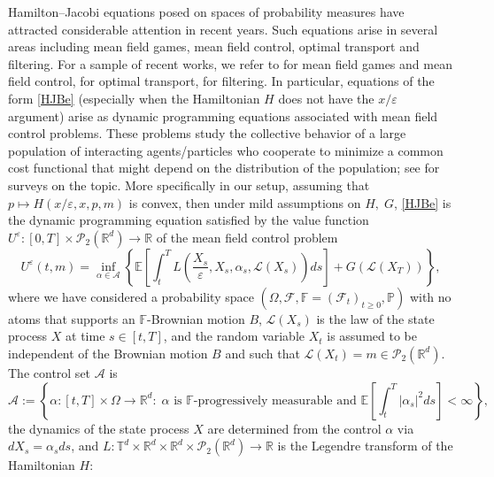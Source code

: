 \documentclass[reqno,11pt]{amsart}
\numberwithin{equation}{section}
\newcommand{\R}{\mathbb{R}} %
\newcommand{\e}{\varepsilon}
\newcommand{\T}{\mathbb{T}}
\renewcommand{\L}{\mathcal{L}}
\newcommand{\nd}{\noindent}
\begin{document}
    \nd
    Hamilton--Jacobi equations posed on spaces of probability measures have attracted considerable attention in recent years. Such equations arise in several areas including mean field games, mean field control, optimal transport and filtering. For a sample of recent works, we refer to \cite{cardaliaguet2019master} for mean field games and mean field control, \cite{bertucci2024stochastic} for optimal transport, \cite{martini2023kolmogorov,BayraktarEkrenHeZhang2025SC} for filtering.
    In particular, equations of the form \eqref{HJBe} (especially when the Hamiltonian $H$ does not have the $x/\e$ argument) arise as dynamic programming equations associated with mean field control problems. These problems study the collective behavior of a large population of interacting agents/particles who cooperate to minimize a common cost functional that might depend on the distribution of the population; see \cite{carmona2018probabilistic, cardaliaguet2019master} for surveys on the topic. More specifically in our setup, assuming that $p\mapsto H(x/\e,x,p,m)$ is convex, then under mild  assumptions on $H,\;G$, \eqref{HJBe}
    is the dynamic programming equation \cite{djete2022mckean1} satisfied by the value function $U^\e\colon [0,T]\times\mathcal{P}_2(\R^d)\to \R$ of the mean field control problem
    \begin{equation}\label{eqn:U_value_function}
        U^\e(t,m)=\inf_{\alpha\in\mathcal{A}}\left\{\mathbb{E}\left[\int^T_{t}L\left(\frac{X_s}{\varepsilon}, X_s, \alpha_s, \L\left(X_s\right)\right)ds \right]+G(\mathcal{L}(X_T))\right\},
    \end{equation}
    where we have considered a probability space $(\Omega,\mathcal{F},\mathbb{F}=(\mathcal{F}_t)_{t\ge 0},\mathbb{P})$ with no atoms that supports an $\mathbb{F}$-Brownian motion $B$, $\mathcal{L}(X_s)$ is the law of the state process $X$ at time $s\in [t,T]$, and the random variable $X_t$ is assumed to be independent of the Brownian motion $B$ and such that $\L(X_t)=m\in \mathcal{P}_2(\R^d)$. The control set $\mathcal{A}$ is \begin{equation}\label{eqn:cs}
    \mathcal{A}:=\left\{\alpha\colon [t,T]\times \Omega\to \R^d:\;\alpha\text{ is }\mathbb{F}\text{-progressively measurable and } \mathbb{E}\left[ \int_t^T|\alpha_s|^2ds\right]<\infty  \right\},
    \end{equation}
    the dynamics of the state process $X$ are determined from the control $\alpha$ via $dX_s=\alpha_sds$, and $L:\T^d\times \R^d\times \R^d\times\mathcal{P}_2(\R^d)\to \R$ is the Legendre transform of the Hamiltonian $H$:
\end{document}
